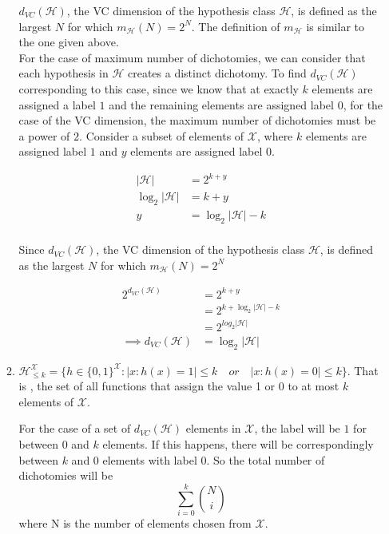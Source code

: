 \begin{enumerate}
\begin{enumerate}
$d_{VC}(\mathcal{H})$, the VC dimension of the hypothesis class $\mathcal{H}$, is defined as the largest $N$ for which $m_{\mathcal{H}}(N) = 2^N$. The definition of $m_{\mathcal{H}} $ is similar to the one given above.\\

For the case of maximum number of dichotomies, we can consider that each hypothesis in $\mathcal{H}$ creates a distinct dichotomy. To find $d_{VC}(\mathcal{H})$ corresponding to this case, since we know that at exactly $k$ elements are assigned a label $1$ and the remaining elements are assigned label $0$, for the case of the VC dimension, the maximum number of dichotomies must be a power of $2$. Consider a subset of elements of $\mathcal{X}$, where $k$ elements are assigned label $1$ and $y$ elements are assigned label $0$.

\begin{equation*}
\begin{aligned}
\left | \mathcal{H} \right | &= 2^{k + y}\\
\log_2 \left | \mathcal{H} \right | &= k+y\\
y &= \log_2 \left | \mathcal{H} \right | - k\\
\end{aligned}
\end{equation*}

Since $d_{VC}(\mathcal{H})$, the VC dimension of the hypothesis class $\mathcal{H}$, is defined as the largest $N$ for which $m_{\mathcal{H}}(N) = 2^N$

\begin{equation*}
\begin{aligned}
2^{d_{VC}(\mathcal{H})} &= 2^{k+y}\\
&= 2^{k+\log_2 \left | \mathcal{H} \right | - k}\\
&= 2^{log_2 \left | \mathcal{H} \right |}\\
\implies d_{VC}(\mathcal{H}) &= \log_2 \left | \mathcal{H} \right |
\end{aligned}
\end{equation*}

  \item $\mathcal{H}_{\leq k}^{\mathcal{X}} = \{h \in
    \{0,1\}^\mathcal{X} : |{x : h(x) = 1} | \leq k \quad or \quad |{x
      : h(x) = 0} | \leq k\}$. That is , the set of all functions that
    assign the value 1 or 0 to at most $k$ elements of $\mathcal{X}$.

For the case of a set of $d_{VC}(\mathcal{H})$ elements in $\mathcal{X}$, the label will be $1$ for between $0$ and $k$ elements. If this happens, there will be correspondingly between $k$ and $0$ elements with label $0$. So the total number of dichotomies will be
$$
\sum_{i=0}^k {N \choose i}
$$
where N is the number of elements chosen from $\mathcal{X}$.


\end{enumerate}
\end{enumerate}

